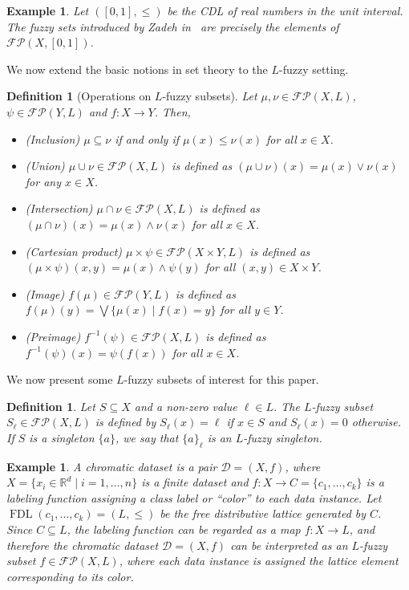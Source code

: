 \documentclass[a4paper,10pt]{article}
\newtheorem{definition}[theorem]{Definition}
\newtheorem{example}[theorem]{Example}
\newcommand{\bbr}{\mathbb{R}}
\newcommand{\calfp}{\mathcal{FP}}
\DeclareMathOperator{\fdl}{FDL}
\begin{document}
\begin{example}
\label{exa:zadehfuzzy}
Let \(([0,1], \leq)\) be the CDL of real numbers in the unit interval. The fuzzy sets introduced by Zadeh in~\cite{zadeh1965fuzzy} are precisely the elements of \(\calfp(X, [0,1])\).
\end{example}

We now extend the basic notions in set theory to the \(L\)-fuzzy setting.

\begin{definition}[Operations on \(L\)-fuzzy subsets]
\label{def:fuzzy_operations}
Let \(\mu, \nu \in \calfp(X,L)\), \(\psi \in \calfp(Y,L)\) and \(f:X \to Y\). Then,
\begin{itemize}
\item (Inclusion) \(\mu \subseteq \nu\) if and only if \(\mu(x) \leq \nu(x)\) for all \(x \in X\).
\item (Union) \(\mu \cup \nu \in \calfp(X,L)\) is defined as \((\mu \cup \nu)(x) = \mu(x) \vee \nu(x)\) for any \(x \in X\).
\item (Intersection) \(\mu \cap \nu \in \calfp(X,L)\) is defined as \((\mu \cap \nu)(x) = \mu(x) \wedge \nu(x)\) for all \(x \in X\).
\item (Cartesian product) \(\mu \times \psi \in \calfp(X \times Y,L)\) is defined as \((\mu \times \psi)(x,y) = \mu(x) \wedge \psi(y)\) for all \((x,y) \in X \times Y\).
\item (Image) \(f(\mu) \in \calfp(Y,L)\) is defined as \(f(\mu)(y) = \bigvee \{\mu(x) \mid f(x) = y\}\) for all \(y \in Y\).
\item (Preimage) \(f^{-1}(\psi) \in \calfp(X,L)\) is defined as \(f^{-1}(\psi)(x) = \psi(f(x))\) for all \(x \in X\).
\end{itemize}
\end{definition}

We now present some \(L\)-fuzzy subsets of interest for this paper.

\begin{definition}
\label{def:fuzzysingleton}
Let \(S \subseteq X\) and a non-zero value \(\ell \in L\). The \(L\)-fuzzy subset \(S_{\ell} \in \calfp(X, L)\) is defined by \(S_{\ell}(x) = \ell\) if \(x \in S\) and \(S_{\ell}(x)=0\) otherwise. 
If \(S\) is a singleton \(\{a\}\), we say that \(\{a\}_{\ell}\) is an \emph{\(L\)-fuzzy singleton}.
\end{definition}

\begin{example}
\label{exa:fdlfuzzy}
A \emph{chromatic dataset} is a pair \(\mathcal{D} = (X,f)\), where  
\(X = \{x_i \in \bbr^d \mid i = 1,\dots,n\}\) is a finite dataset and  
\(f : X \to C = \{c_1,\dots,c_k\}\) is a labeling function assigning a class label or ``color'' to each data instance. Let \(\fdl(c_1,\ldots,c_k) = (L,\leq)\) be the free distributive lattice generated by \(C\). Since \(C \subseteq L\), the labeling function can be regarded as a map \(f : X \to L\), and therefore the chromatic dataset \(\mathcal{D} = (X,f)\) can be interpreted as an \(L\)-fuzzy subset \(f \in \calfp(X,L)\), where each data instance is assigned the lattice element corresponding to its color.
\end{example}
\end{document}
